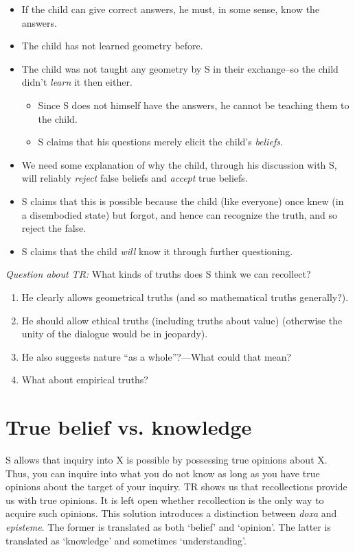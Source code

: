\documentclass[10 pt]{article}
\begin{document}
\begin{itemize}
\item If the child can give correct answers, he must, in some sense, know the answers. 
\item The child has not learned geometry before. 
\item The child was not taught any geometry by S in their exchange--so the child didn't \emph{learn} it then either.
\begin{itemize}
\item Since S does not himself have the answers, he cannot be teaching them to the child. 
\item S claims that his questions merely elicit the child's \emph{beliefs}. 
\end{itemize}
\item We need some explanation of why the child, through his discussion with S, will reliably \emph{reject} false beliefs and \emph{accept} true beliefs. 
\item S claims that this is possible because the child (like everyone) once knew (in a disembodied state) but forgot, and hence can recognize the truth, and so reject the false.
\item S claims that the child \emph{will} know it through further questioning.
\end{itemize}
 
\noindent \emph{Question about TR:} What kinds of truths does S think we can recollect?
\begin{enumerate}
\item He clearly allows geometrical truths (and so mathematical truths generally?). 
\item He should allow ethical truths (including truths about value) (otherwise the unity of the dialogue would be in jeopardy). 
\item He also suggests nature ``as a whole''?---What could that mean?\item What about empirical truths? 
\end{enumerate}
 
 

\section*{True belief vs. knowledge}
S allows that inquiry into X is possible by possessing true opinions about X. Thus, you can inquire into what you do not know as long as you have true opinions about the target of your inquiry. TR shows us that recollections provide us with true opinions. It is left open whether recollection is the only way to acquire such opinions. This solution introduces a distinction between \emph{doxa} and \emph{episteme}. The former is translated as both `belief' and `opinion'. The latter is translated as `knowledge' and sometimes `understanding'. 
\end{document}
